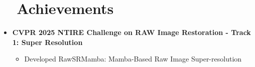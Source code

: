 \documentclass[a4paper,11pt]{article}
\makeatletter
\newcommand{\resumeSubheading}[4]{
  \vspace{-2pt}\item
    \begin{tabular*}{0.97\textwidth}[t]{l@{\extracolsep{\fill}}r}
      \textbf{#1} & \textbf{#2} \\
      \textit{\small#3} & \textit{\small #4} \\
    \end{tabular*}\vspace{-7pt}
}
\newcommand{\resumeSubHeadingListStart}{\begin{itemize}[leftmargin=0.15in, label={}]}
\newcommand{\resumeSubHeadingListEnd}{\end{itemize}}
\makeatother
\begin{document}

\vspace{0.25cm}
\section{\faTrophy\ \ Achievements}
  \resumeSubHeadingListStart
  \vspace{0.25cm}
    \item \textbf{CVPR 2025 NTIRE Challenge on RAW Image Restoration - Track 1: Super Resolution}
    \begin{itemize}[leftmargin=0.3in]
        \item Developed RawSRMamba: Mamba-Based Raw Image Super-resolution
    \end{itemize}
  \resumeSubHeadingListEnd
\end{document}
